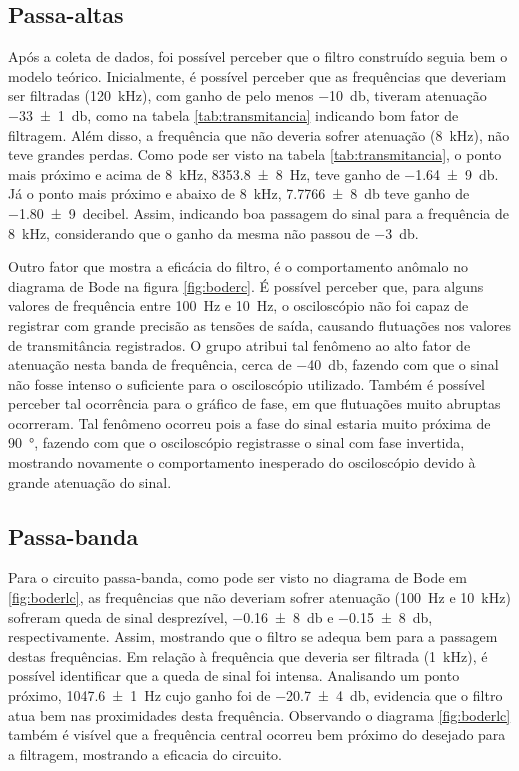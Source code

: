 \subsection{Passa-altas}

  Após a coleta de dados, foi possível perceber que o filtro construído seguia bem o modelo teórico. Inicialmente, é possível perceber que as frequências que deveriam ser filtradas (\SI{120}{\kilo\hertz}), com ganho de pelo menos \SI{-10}{\decibel}, tiveram atenuação \SI{-33(1)}{\decibel}, como na tabela \ref{tab:transmitancia} indicando bom fator de filtragem. Além disso, a frequência que não deveria sofrer atenuação (\SI{8}{\kilo\hertz}), não teve grandes perdas. Como pode ser visto na tabela \ref{tab:transmitancia}, o ponto mais próximo e acima de \SI{8}{\kilo\hertz}, \SI{8353,8(8)}{\hertz}, teve ganho de \SI{-1,64(9)}{\decibel}. Já o ponto mais próximo e abaixo de \SI{8}{\kilo\hertz}, \SI{7,7766(8)}{\decibel} teve ganho de \SI{-1,80(9)}{decibel}. Assim, indicando boa passagem do sinal para a frequência de \SI{8}{\kilo\hertz}, considerando que o ganho da mesma não passou de \SI{-3}{\decibel}.

  Outro fator que mostra a eficácia do filtro, é o comportamento anômalo no diagrama de Bode na figura \ref{fig:boderc}. É possível perceber que, para alguns valores de frequência entre \SI{100}{\hertz} e \SI{10}{\hertz}, o osciloscópio não foi capaz de registrar com grande precisão as tensões de saída, causando flutuações nos valores de transmitância registrados. O grupo atribui tal fenômeno ao alto fator de atenuação nesta banda de frequência, cerca de \SI{-40}{\decibel}, fazendo com que o sinal não fosse intenso o suficiente para o osciloscópio utilizado. Também é possível perceber tal ocorrência para o gráfico de fase, em que flutuações muito abruptas ocorreram. Tal fenômeno ocorreu pois a fase do sinal estaria muito próxima de \SI{90}{\degree}, fazendo com que o osciloscópio registrasse o sinal com fase invertida, mostrando novamente o comportamento inesperado do osciloscópio devido à grande atenuação do sinal.

\subsection{Passa-banda}

  Para o circuito passa-banda, como pode ser visto no diagrama de Bode em \ref{fig:boderlc}, as frequências que não deveriam sofrer  atenuação (\SI{100}{\hertz} e \SI{10}{\kilo\hertz}) sofreram queda de sinal desprezível, \SI[scientific-notation=false]{-0,16(8)}{\decibel} e \SI[scientific-notation=false]{-0,15(8)}{\decibel}, respectivamente. Assim, mostrando que o filtro se adequa bem para a passagem destas frequências. Em relação à frequência que deveria ser filtrada (\SI{1}{\kilo\hertz}), é possível identificar que a queda de sinal foi intensa. Analisando um ponto próximo, \SI{1047,6(1)}{\hertz} cujo ganho foi de \SI{-20,7(4)}{\decibel}, evidencia que o filtro atua bem nas proximidades desta frequência. Observando o diagrama \ref{fig:boderlc} também é visível que a frequência central ocorreu bem próximo do desejado para a filtragem, mostrando a eficacia do circuito.

